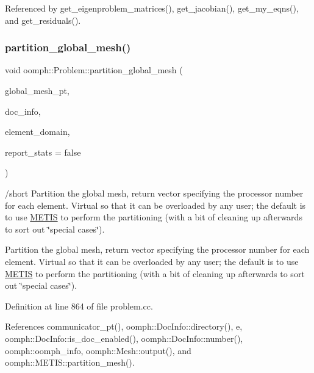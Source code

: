 Referenced by get\+\_\+eigenproblem\+\_\+matrices(), get\+\_\+jacobian(), get\+\_\+my\+\_\+eqns(), and get\+\_\+residuals().

\mbox{\label{classoomph_1_1Problem_ad29fc4bc4d4bead472059765fbbd3b11}} 
\subsubsection{\texorpdfstring{partition\+\_\+global\+\_\+mesh()}{partition\_global\_mesh()}}
{\footnotesize\ttfamily void oomph\+::\+Problem\+::partition\+\_\+global\+\_\+mesh (\begin{DoxyParamCaption}\item[{\hyperlink{classoomph_1_1Mesh}{Mesh} $\ast$\&}]{global\+\_\+mesh\+\_\+pt,  }\item[{\hyperlink{classoomph_1_1DocInfo}{Doc\+Info} \&}]{doc\+\_\+info,  }\item[{\hyperlink{classoomph_1_1Vector}{Vector}$<$ unsigned $>$ \&}]{element\+\_\+domain,  }\item[{const bool \&}]{report\+\_\+stats = {\ttfamily false} }\end{DoxyParamCaption})\hspace{0.3cm}{\ttfamily [virtual]}}

/short Partition the global mesh, return vector specifying the processor number for each element. Virtual so that it can be overloaded by any user; the default is to use \hyperlink{namespaceoomph_1_1METIS}{M\+E\+T\+IS} to perform the partitioning (with a bit of cleaning up afterwards to sort out \char`\"{}special cases\char`\"{}).

Partition the global mesh, return vector specifying the processor number for each element. Virtual so that it can be overloaded by any user; the default is to use \hyperlink{namespaceoomph_1_1METIS}{M\+E\+T\+IS} to perform the partitioning (with a bit of cleaning up afterwards to sort out \char`\"{}special cases\char`\"{}). 

Definition at line 864 of file problem.\+cc.



References communicator\+\_\+pt(), oomph\+::\+Doc\+Info\+::directory(), e, oomph\+::\+Doc\+Info\+::is\+\_\+doc\+\_\+enabled(), oomph\+::\+Doc\+Info\+::number(), oomph\+::oomph\+\_\+info, oomph\+::\+Mesh\+::output(), and oomph\+::\+M\+E\+T\+I\+S\+::partition\+\_\+mesh().



